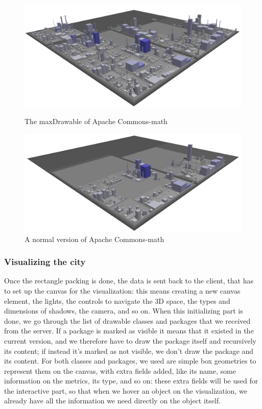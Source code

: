 \documentclass[]{usiinfbachelorproject}
\begin{document}
\begin{figure}[H]
  \centering
  \begin{minipage}[b]{0.49\textwidth}
      \includegraphics[width=1\textwidth]{pictures/maxDrawable1.png}
      \caption{The maxDrawable of Apache Commons-math}
      \label{fig:interface}
  \end{minipage}
  \hfill
  \begin{minipage}[b]{0.49\textwidth}
      \includegraphics[width=1\textwidth]{pictures/maxDrawable2.png}
      \caption{A normal version of Apache Commons-math}
      \label{fig:interface2}
  \end{minipage}
\end{figure}


\subsubsection{Visualizing the city} \label{Visualizing the city}
Once the rectangle packing is done, the data is sent back to the client, that has to set up the canvas for the visualization: this means creating a new canvas element, the lights, the controls to navigate the 3D space, the types and dimensions of shadows, the camera, and so on.
When this initializing part is done, we go through the list of drawable classes and packages that we received from the server. If a package is marked as visible it means that it existed in the current version, and we therefore have to draw the package itself and recursively its content; if instead it's marked as not visible, we don't draw the package and its content.
For both classes and packages, we used are simple box geometries to represent them on the canvas, with extra fields added, like its name, some information on the metrics, its type, and so on: these extra fields will be used for the interactive part, so that when we hover an object on the visualization, we already have all the information we need directly on the object itself.
\end{document}
